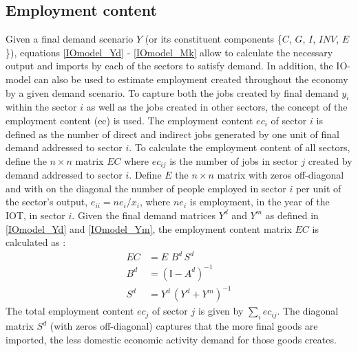 \documentclass[12pt,english]{article}
\newcommand{\mli}[1]{\mathit{#1}}
\begin{document}
\subsection{Employment content}\label{ec}


Given a final demand scenario $Y$ (or its constituent components \{$C$, $G$, $I$, $\mli{INV}$, $E$\}), equations \ref{IOmodel_Yd} - \ref{IOmodel_Mk} allow to calculate the necessary output and imports by each of the sectors to satisfy demand. In addition, the IO-model can also be used to estimate employment created throughout the economy by a given demand scenario. To capture both the jobs created by final demand $y_i$ %
within the sector $i$ as well as the jobs created in other sectors, the concept of the employment content (ec) is used. The employment content $ec_i$ of sector $i$ is defined as the number of direct and indirect jobs generated by one unit of final demand addressed to %
sector $i$. To calculate the employment content of all sectors, define the $n \times n$ matrix $EC$ where $ec_{ij}$  is the number of jobs in sector $j$ created by demand addressed to sector $i$. Define $E$ the $n\times n$ matrix with zeros off-diagonal and with on the diagonal the number of people employed in sector $i$ per unit of the sector's output, $e_{ii}=ne_i/x_i$, where $ne_i$ is employment, in the year of the IOT, in sector $i$. Given the final demand matrices $Y^d$ and $Y^m$ as defined in \ref{IOmodel_Yd} and \ref{IOmodel_Ym}, the employment content matrix $EC$ is calculated as :
\begin{align}
EC	 &= E\,  \, B^d \, S^d \label{EC} \\ 
B^d &=  (\mathbb{I}-A^d)^{-1} \\
S^d	 &=  Y^d \, (Y^d+Y^m)^{-1}  
\end{align}
The total employment content $ec_j$ of sector $j$ is given by $\sum_i ec_{ij}$. The diagonal matrix $S^d$ (with zeros off-diagonal) captures that the more final goods are imported, the less domestic economic activity demand for those goods creates.
\end{document}
